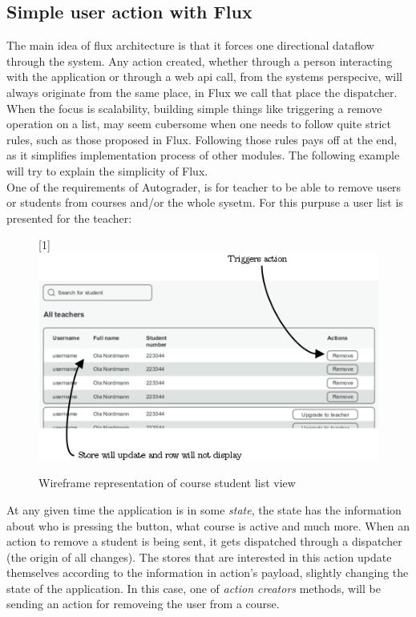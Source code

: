 \subsection{Simple user action with Flux}\label{sec:simplefluxexample}
The main idea of flux architecture is that it forces one directional dataflow through the system. Any action created, whether through a person interacting with the application or through a web api call, from the systems perspecive, will always originate from the same place, in Flux we call that place the dispatcher. When the focus is scalability, building simple things like triggering a remove operation on a list, may seem cubersome when one needs to follow quite strict rules, such as those proposed in Flux. Following those rules pays off at the end, as it simplifies implementation process of other modules. The following example will try to explain the simplicity of Flux.
\\One of the requirements of Autograder, is for teacher to be able to remove users or students from courses and/or the whole sysetm. For this purpuse a user list is presented for the teacher:
\begin{figure}[h]
  \scalebox{1}[1]{{\includegraphics[width=1\linewidth]{graphics/simpleremoveuser.png}}}
  \caption{Wireframe representation of course student list view}
  \label{fig:simpleremoveuser}
\end{figure}

At any given time the application is in some \emph{state}, the state has the information about who is pressing the button, what course is active and much more. When an action to remove a student is being sent, it gets dispatched through a dispatcher (the origin of all changes). The stores that are interested in this action update themselves according to the information in action's payload, slightly changing the state of the application. In this case, one of \emph{action creators} methods, will be sending an action for removeing the user from a course.

